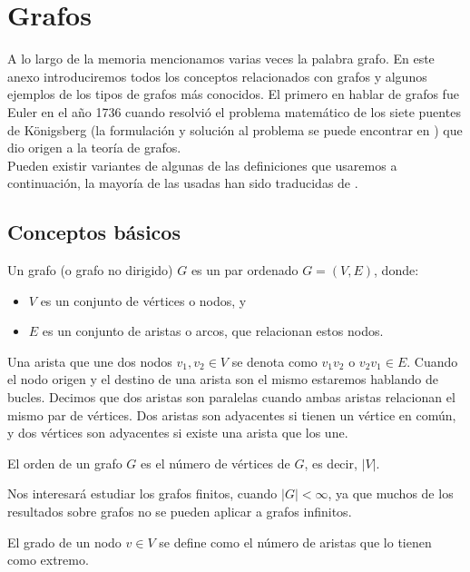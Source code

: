 \chapter{Grafos}

A lo largo de la memoria mencionamos varias veces la palabra grafo. En este anexo introduciremos todos los conceptos relacionados con grafos y algunos ejemplos de los tipos de grafos más conocidos. El primero en hablar de grafos fue Euler en el año 1736 cuando resolvió el problema matemático de los siete puentes de Königsberg (la formulación y solución al problema se puede encontrar en \cite{refpuentes}) que dio origen a la teoría de grafos.\\

Pueden existir variantes de algunas de las definiciones que usaremos a continuación, la mayoría de las usadas han sido traducidas de \cite{librografos}.

\section{Conceptos básicos}

\begin{defi} 
	Un grafo (o grafo no dirigido) $G$ es un par ordenado $G=(V,E)$, donde:
	\begin{itemize}
		\item $V$ es un conjunto de vértices o nodos, y
		\item $E$ es un conjunto de aristas o arcos, que relacionan estos nodos.
	\end{itemize}
\end{defi}

Una arista que une dos nodos $v_{1},v_{2} \in V$ se denota como $v_{1}v_{2}$ o $v_{2}v_{1} \in E$. Cuando el nodo origen y el destino de una arista son el mismo estaremos hablando de bucles. Decimos que dos aristas son paralelas cuando ambas aristas relacionan el mismo par de vértices. Dos aristas son adyacentes si tienen un vértice en común, y dos vértices son adyacentes si existe una arista que los une.

\begin{defi} 
	El orden de un grafo $G$ es el número de vértices de $G$, es decir, $|V|$.
\end{defi}

Nos interesará estudiar los grafos finitos, cuando $|G|< \infty$, ya que muchos de los resultados sobre grafos no se pueden aplicar a grafos infinitos.

\begin{defi} 
	El grado de un nodo $v \in V$ se define como el número de aristas que lo tienen como extremo.
\end{defi}

